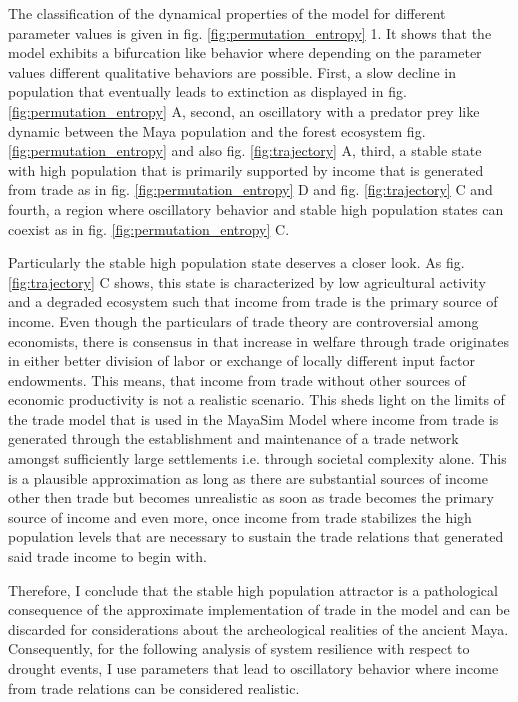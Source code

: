 The classification of the dynamical properties of the model for different parameter values is given in fig. \ref{fig:permutation_entropy} 1. It shows that the model exhibits a bifurcation like behavior where depending on the parameter values different qualitative behaviors are possible. First, a slow decline in population that eventually leads to extinction as displayed in fig. \ref{fig:permutation_entropy} A, second, an oscillatory with a predator prey like dynamic between the Maya population and the forest ecosystem fig. \ref{fig:permutation_entropy} and also fig. \ref{fig:trajectory} A, third, a stable state with high population that is primarily supported by income that is generated from trade as in fig. \ref{fig:permutation_entropy} D and fig. \ref{fig:trajectory} C and fourth, a region where oscillatory behavior and stable high population states can coexist as in fig. \ref{fig:permutation_entropy} C.


Particularly the stable high population state deserves a closer look. As fig. \ref{fig:trajectory} C shows, this state is characterized by low agricultural activity and a degraded ecosystem such that income from trade is the primary source of income. Even though the particulars of trade theory are controversial among economists, there is consensus in that increase in welfare through trade originates in either better division of labor or exchange of locally different input factor endowments. This means, that income from trade without other sources of economic productivity is not a realistic scenario. This sheds light on the limits of the trade model that is used in the MayaSim Model where income from trade is generated through the establishment and maintenance of a trade network amongst sufficiently large settlements i.e. through societal complexity alone. This is a plausible approximation as long as there are substantial sources of income other then trade but becomes unrealistic as soon as trade becomes the primary source of income and even more, once income from trade stabilizes the high population levels that are necessary to sustain the trade relations that generated said trade income to begin with.

Therefore, I conclude that the stable high population attractor is a pathological consequence of the approximate implementation of trade in the model and can be discarded for considerations about the archeological realities of the ancient Maya.
Consequently, for the following analysis of system resilience with respect to drought events, I use parameters that lead to oscillatory behavior where income from trade relations can be considered realistic.

